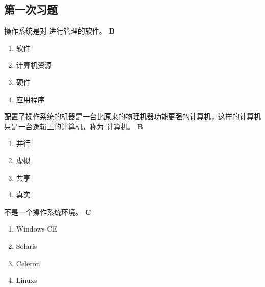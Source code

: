 \subsection*{第一次习题}
\setcounter{problemname}{0}

\begin{problem}
	操作系统是对 \myline 进行管理的软件。
	\textbf{B}
	\vspace{-0.5em}
	\begin{multicols}{4}
		\begin{enumerate}[label=\Alph*.]
			\item 软件
			\item 计算机资源
			\item 硬件
			\item 应用程序
		\end{enumerate}
	\end{multicols}
	\vspace{-1em}
\end{problem}


\begin{problem}
	配置了操作系统的机器是一台比原来的物理机器功能更强的计算机，这样的计算机只是一台逻辑上的计算机，称为 \myline 计算机。
	\textbf{B}
	\vspace{-0.5em}
	\begin{multicols}{4}
		\begin{enumerate}[label=\Alph*.]
			\item 并行
			\item 虚拟
			\item 共享
			\item 真实
		\end{enumerate}
	\end{multicols}
	\vspace{-1em}
\end{problem}


\begin{problem}
	\myline 不是一个操作系统环境。
	\textbf{C}
	\vspace{-0.5em}
	\begin{multicols}{4}
		\begin{enumerate}[label=\Alph*.]
			\item Windows CE
			\item Solaris
			\item Celeron
			\item Linuxs
		\end{enumerate}
	\end{multicols}
	\vspace{-1em}
\end{problem}


